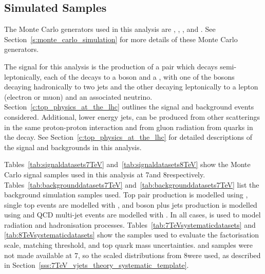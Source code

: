 


\subsection{Simulated Samples}
\label{ss:simulated_samples}
The Monte Carlo generators used in this analysis are \MADGRAPH \cite{madgraph5}, \PYTHIA \cite{pythia8},
\POWHEG \cite{powheg_Nason, powheg_Frixione, powheg_Alioli}, \HERWIG \cite{herwig} and \MCATNLO
\cite{mcatnlo_Frixione1, mcatnlo_Frixione2}. See Section~\ref{s:monte_carlo_simulation} for more details of
these Monte Carlo generators.

The signal for this analysis is the production of a \ttbar pair which decays semi-leptonically, \ie each of
the \tquarks decays to a \W boson and a \bjet, with one of the \W bosons decaying hadronically to two jets and
the other decaying leptonically to a lepton (electron or muon) and an associated neutrino.
Section~\ref{c:top_physics_at_the_lhc} outlines the signal and background events considered. Additional, lower
energy jets, can be produced from other scatterings in the same proton-proton interaction and from gluon
radiation from quarks in the decay. See Section~\ref{c:top_physics_at_the_lhc} for detailed descriptions of
the signal and backgrounds in this analysis.

Tables~\ref{tab:signaldatasets7TeV} and~\ref{tab:signaldatasets8TeV} show the Monte Carlo signal samples used
in this analysis at 7\TeV and 8\TeV respectively. Tables~\ref{tab:backgrounddatasets7TeV}
and~\ref{tab:backgrounddatasets7TeV} %
list the background simulation samples
used. Top pair production is modelled using \MADGRAPH, single top events are modelled with \POWHEG, \W and \Z boson plus jets production is
modelled using \MADGRAPH and QCD multi-jet events are modelled with \PYTHIA. In all cases, \PYTHIA is used to
model radiation and hadronisation processes. Tables~\ref{tab:7TeVsystematicdatasets} and
\ref{tab:8TeVsystematicdatasets} show the samples used to evaluate the factorisation scale, matching
threshold, and top quark mass uncertainties. \WpJets and \ZpJets samples were not made available at 7\TeV, so
the scaled distributions from 8\TeV were used, as described in
Section~\ref{sss:7TeV_vjets_theory_systematic_template}.








